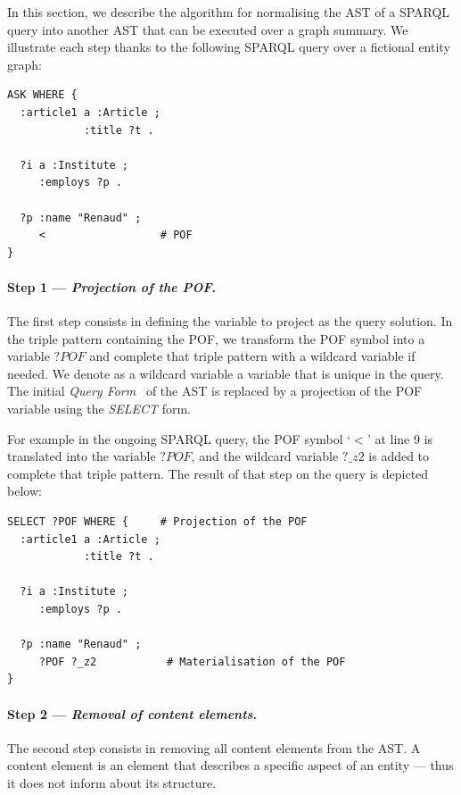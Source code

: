 In this section, we describe the algorithm for normalising the AST of a SPARQL query into another AST that can be executed over a graph summary.
We illustrate each step thanks to the following SPARQL query over a fictional entity graph:

\begin{verbatim}
ASK WHERE {
  :article1 a :Article ;
            :title ?t .
 
  ?i a :Institute ;
     :employs ?p .
 
  ?p :name "Renaud" ;
     <                  # POF
}
\end{verbatim}

\paragraph{Step 1 --- \emph{Projection of the POF}.}

The first step consists in defining the variable to project as the query solution. In the triple pattern containing the \gls{POF}, we transform the \gls{POF} symbol into a variable $?POF$ and complete that triple pattern with a wildcard variable if needed. We denote as a wildcard variable a variable that is unique in the query. The initial \emph{Query Form}~\cite{PrudS08} of the AST is replaced by a projection of the \gls{POF} variable using the \emph{SELECT} form.

For example in the ongoing SPARQL query, the \gls{POF} symbol `$<$' at line 9 is translated into the variable $?POF$, and the wildcard variable $?\_z2$ is added to complete that triple pattern.
 The result of that step on the query is depicted below:

\begin{verbatim}
SELECT ?POF WHERE {     # Projection of the POF
  :article1 a :Article ;
            :title ?t .
 
  ?i a :Institute ;
     :employs ?p .
 
  ?p :name "Renaud" ;
     ?POF ?_z2           # Materialisation of the POF
}
\end{verbatim}

\paragraph{Step 2 --- \emph{Removal of content elements}.}

The second step consists in removing all content elements from the AST. A content element is an element that describes a specific aspect of an entity --- thus it does not inform about its structure.

